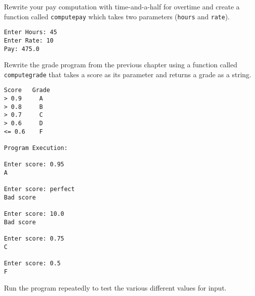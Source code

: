 \begin{ex}
Rewrite your pay computation with time-and-a-half for overtime
and create a function called {\tt computepay} which takes
two parameters ({\tt hours} and {\tt rate}).

\begin{verbatim}
Enter Hours: 45
Enter Rate: 10
Pay: 475.0
\end{verbatim}
\end{ex}

\begin{ex}
Rewrite the grade program from the previous chapter 
using a function called {\tt computegrade} that takes
a score as its parameter and returns a grade as a string.

\begin{verbatim}
Score   Grade
> 0.9     A
> 0.8     B
> 0.7     C
> 0.6     D
<= 0.6    F

Program Execution:

Enter score: 0.95
A

Enter score: perfect
Bad score

Enter score: 10.0
Bad score

Enter score: 0.75
C

Enter score: 0.5
F
\end{verbatim}

Run the program repeatedly to test the various different values
for input.
\end{ex}


